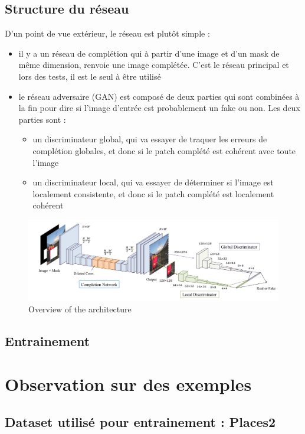 \documentclass[12pt]{article}
\begin{document}
\subsection{Structure du réseau}
D'un point de vue extérieur, le réseau est plutôt simple : 
\begin{itemize}
    \item il y a un réseau de complétion qui à partir d'une image et d'un mask de même dimension, renvoie une image complétée. C'est le réseau principal et lors des tests, il est le seul à être utilisé
    \item le réseau adversaire (GAN) est composé de deux parties qui sont combinées à la fin pour dire si l'image d'entrée est probablement un fake ou non. Les deux parties sont : 
    \begin{itemize}
        \item un discriminateur global, qui va essayer de traquer les erreurs de complétion globales, et donc si le patch complété est cohérent avec toute l'image
        \item un discriminateur local, qui va essayer de déterminer si l'image est localement consistente, et donc si le patch complété est localement cohérent
    \end{itemize}
\end{itemize}

\begin{figure}[H]
    \includegraphics[width=1.0\textwidth]{Images/network_overview.png}
    \caption{Overview of the architecture}
\end{figure}

\subsection{Entrainement}

\section{Observation sur des exemples}

\subsection{Dataset utilisé pour entrainement : Places2}
\end{document}
